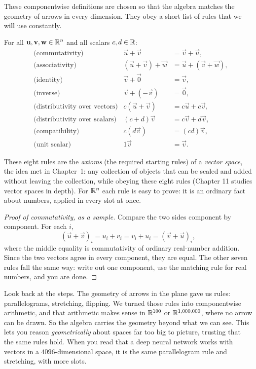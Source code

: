 These componentwise definitions are chosen so that
the algebra matches the geometry of arrows in every dimension. They obey a
short list of rules that we will use constantly.

\begin{formalbox}
\begin{proposition}
\label{ch02:prop-axioms}
For all $\mathbf{u},\mathbf{v},\mathbf{w}\in\mathbb{R}^n$ and all scalars $c,d\in\mathbb{R}$:
\begin{align*}
  &\text{(commutativity)} & \vec{u}+\vec{v} &= \vec{v}+\vec{u}, \\
  &\text{(associativity)} & (\vec{u}+\vec{v})+\vec{w} &= \vec{u}+(\vec{v}+\vec{w}), \\
  &\text{(identity)} & \vec{v}+\vec{0} &= \vec{v}, \\
  &\text{(inverse)} & \vec{v}+(-\vec{v}) &= \vec{0}, \\
  &\text{(distributivity over vectors)} & c(\vec{u}+\vec{v}) &= c\vec{u}+c\vec{v}, \\
  &\text{(distributivity over scalars)} & (c+d)\vec{v} &= c\vec{v}+d\vec{v}, \\
  &\text{(compatibility)} & c(d\vec{v}) &= (cd)\vec{v}, \\
  &\text{(unit scalar)} & 1\vec{v} &= \vec{v}.
\end{align*}
\end{proposition}
\end{formalbox}

These eight rules are the \emph{axioms} (the required starting rules) of a
\emph{vector space}, the idea met in Chapter~1: any collection of objects that can be
scaled and added without leaving the collection, while obeying these eight rules
(Chapter 11 studies vector spaces in depth). For $\mathbb{R}^n$ each rule is easy to prove: it is
an ordinary fact about numbers, applied in every slot at once.

\begin{proof}[Proof of commutativity, as a sample]
Compare the two sides component by component. For each $i$,
\[
  (\vec{u}+\vec{v})_i = u_i + v_i = v_i + u_i = (\vec{v}+\vec{u})_i,
\]
where the middle equality is commutativity of ordinary real-number addition. Since
the two vectors agree in every component, they are equal. The other seven rules fall the
same way: write out one component, use the matching rule for real numbers, and you are
done.
\end{proof}

\begin{aestheticbox}
Look back at the steps. The geometry of arrows in the plane gave us rules:
parallelograms, stretching, flipping. We turned those rules into componentwise
arithmetic, and that arithmetic makes sense in $\mathbb{R}^{100}$ or $\mathbb{R}^{1{,}000{,}000}$,
where no arrow can be drawn. So the algebra carries the geometry beyond what we can see.
This lets you reason \emph{geometrically} about spaces far too big to picture, trusting
that the same rules hold. When you read that a deep neural network works with vectors
in a $4096$-dimensional space, it is the same parallelogram rule and stretching, with
more slots.
\end{aestheticbox}

